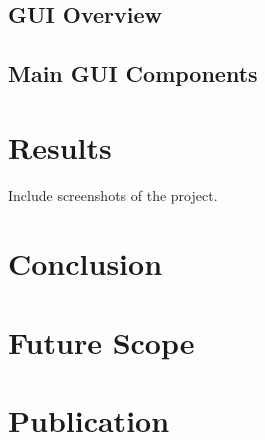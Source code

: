 \documentclass[11pt]{report}
\begin{document}
\section{GUI Overview}
\section{Main GUI Components}

\chapter{Results}
Include screenshots of the project.

\chapter{Conclusion}

\chapter{Future Scope}

\chapter{Publication}
   
\begin{thebibliography}{999}
\bibitem{}


\end{thebibliography}
\end{document}
